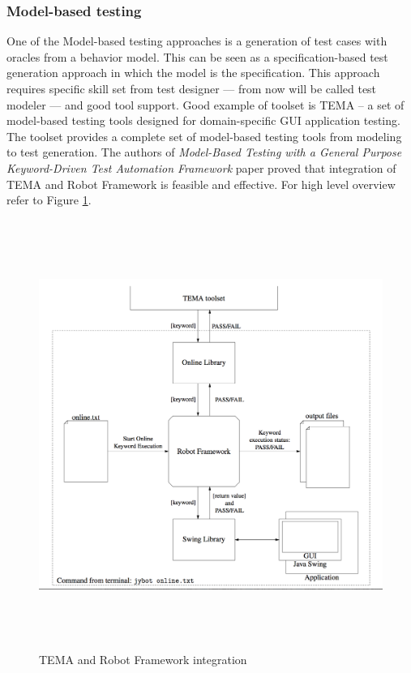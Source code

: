 \documentclass[12pt,twoside]{article}
\begin{document}
\subsubsection{Model-based testing}
One of the Model-based testing approaches is a generation of test cases with oracles from a behavior model. This can be seen as a specification-based test generation approach in which the model is the specification. This approach requires specific skill set from test designer --- from now will be called test modeler --- and good tool support. Good example of toolset is TEMA -- a set of model-based testing tools designed for domain-specific GUI application testing. The toolset provides a complete set of model-based testing tools from modeling to test generation. The authors of \emph{Model-Based Testing with a General Purpose Keyword-Driven Test Automation Framework} paper proved that integration of TEMA and Robot Framework is feasible and effective. For high level overview refer to Figure \ref{integration}.

\begin{figure}[H]
\centering
\includegraphics[width=160mm, height=140mm]{robot_tema_int.png}
\caption{TEMA and Robot Framework integration ~\cite{ref:2.1} }
\label{integration}
\end{figure}
\end{document}
